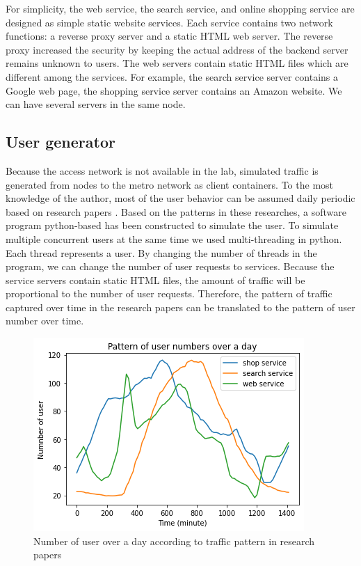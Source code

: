 \documentclass[conference]{IEEEtran}
\begin{document}
For simplicity, the web service, the search service, and online shopping service are designed as simple static website services. Each service contains two network functions: a reverse proxy server and a static HTML web server. The reverse proxy increased the security by keeping the actual address of the backend server remains unknown to users. The web servers contain static HTML files which are different among the services. For example, the search service server contains a Google web page, the shopping service server contains an Amazon website. We can have several servers in the same node.

\subsection{User generator}

Because the access network is not available in the lab, simulated traffic is generated from nodes to the metro network as client containers. To the most knowledge of the author, most of the user behavior can be assumed daily periodic based on research papers \cite{Kooti2016, Ullah2012, Taghavi2012, Yu2006}. Based on the patterns in these researches, a software program python-based has been constructed to simulate the user. To simulate multiple concurrent users at the same time we used multi-threading in python. Each thread represents a user. By changing the number of threads in the program, we can change the number of user requests to services. Because the service servers contain static HTML files, the amount of traffic will be proportional to the number of user requests. Therefore, the pattern of traffic captured over time in the research papers can be translated to the pattern of user number over time. 

\begin{figure}[]
    \centering
    \includegraphics[scale = 0.55]{imgs/user_pattern_a_day.png}
    \caption{Number of user over a day according to traffic pattern in research papers}
    \label{fig:user_pattern}
\end{figure}
\end{document}
